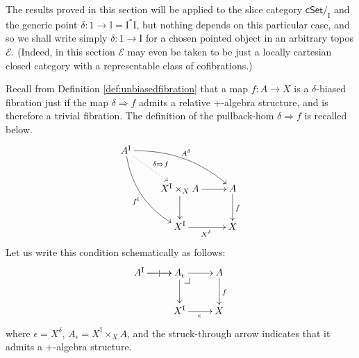 \documentclass[12pt]{article}
\makeatletter
\newcommand{\EE}{\ensuremath{\mathcal{E}}}
\newcommand{\cSet}{\ensuremath{\mathsf{cSet}}}
\newcommand{\ra}{\ensuremath{\rightarrow}}
\renewcommand{\to}{\ensuremath{\rightarrow}}
\newcommand{\pbh}[2]{#1\!\Rightarrow\!#2}
\newcommand{\I}{\ensuremath{\mathrm{I}}}
\newcommand{\II}{\ensuremath{\mathbb{I}}}
\theoremstyle{remark}
\theoremstyle{definition}
\newcommand{\pbcorner}[1][dr]{\save*!/#1-1.2pc/#1:(-1,1)@^{|-}\restore}
\makeatother
\begin{document}
The results proved in this section will be applied to the slice category $\cSet/_\I$ and the generic point $\delta : 1 \ra \II = \I^*\I$, but nothing depends on this particular case, and so we shall write simply $\delta : 1\to \I$ for a chosen pointed object in an arbitrary topos $\EE$.  (Indeed, in this section $\EE$ may even be taken to be just a locally cartesian closed category with a representable class of cofibrations.)

Recall from Definition \ref{def:unbiasedfibration} that a map $f:A\ra X$  is a $\delta$-biased fibration just if the map $\delta \Rightarrow f$ admits a relative +-algebra structure, and is therefore a trivial fibration.  The definition of the pullback-hom $\pbh{\delta}{f}$ is recalled below.
\begin{equation}\label{diagram:frobenius1}
\xymatrix{
A^\I \ar@/_3ex/ [rdd]_{f^\I} \ar@{.>}[rd]^{\delta\Rightarrow{f}} \ar@/^3ex/ [rrd]^{A^{\delta}}  && \\
& X^\I \times_{X} A \ar[d] \ar[r] & A \ar[d]^{f} \\
& X^\I \ar[r]_{X^{\delta}} &  X
}
\end{equation}
Let us write this condition schematically as follows:
\begin{equation}\label{diagram:frobenius1}
\xymatrix{
A^\I \ar[r]|| \ar[r]  & A_\epsilon\ar[d] \pbcorner \ar[r] & A \ar[d]^f \\
& X^\I \ar[r]_{\epsilon} &  X
}
\end{equation}
where $\epsilon = X^{\delta}$, $A_\epsilon = X^\I \times_{X} A$, and the struck-through arrow indicates that it admits a +-algebra structure.
\end{document}

